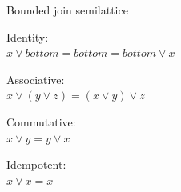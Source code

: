 \documentclass[UKenglish,usenames,dvipsnames,svgnames,table,aspectratio=169,mathserif]{beamer}
\newcommand{\nl}{\vspace{\baselineskip}}
\begin{document}






\begin{frame}[fragile]
\centering \huge
Bounded join semilattice
\nl
\large

Identity: \\
$x \vee bottom = bottom = bottom \vee x$
\nl

Associative: \\
$x \vee (y \vee z) = (x \vee y) \vee z$
\nl

Commutative: \\
$x \vee y = y \vee x$
\nl

Idempotent: \\
$x \vee x = x$

\end{frame}
\end{document}
